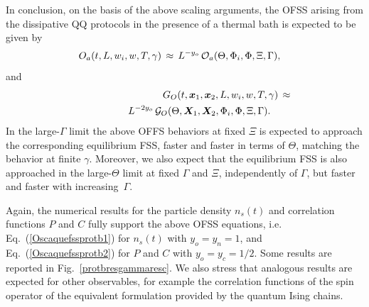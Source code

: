 In conclusion, on the basis of the above scaling arguments, the OFSS
arising from the dissipative QQ protocols in the presence of a thermal
bath is expected to be given by
\begin{eqnarray}
   O_a(t, L, w_i, w, T, \gamma) \, \approx \, L^{-y_o} \,
  {\cal O}_a(\Theta, \Phi_i, \Phi, \Xi, \Gamma),\quad
  \label{Oscaquefssprotb1}
\end{eqnarray}
and
\begin{eqnarray}
&& G_{O}(t, {\bm x}_1, {\bm x}_2, L, w_i, w, T, \gamma)  \, \approx
    \label{Oscaquefssprotb2} \\
    &&\qquad\qquad
     L^{-2y_o} \, {\cal G}_{O}(\Theta, {\bm X}_1, {\bm X}_2, \Phi_i,
    \Phi, \Xi, \Gamma). \qquad \nonumber
\end{eqnarray}
In the large-$\Gamma$ limit the above OFFS behaviors at fixed $\Xi$ is
expected to approach the corresponding equilibrium FSS, faster and
faster in terms of $\Theta$, matching the behavior at finite $\gamma$.
Moreover, we also expect that the equilibrium FSS is also approached
in the large-$\Theta$ limit at fixed $\Gamma$ and $\Xi$, independently
of $\Gamma$, but faster and faster with increasing~$\Gamma$.

Again, the numerical results for the particle density $n_s(t)$ and
correlation functions $P$ and $C$ fully support the above OFSS
equations, i.e. Eq.~(\ref{Oscaquefssprotb1}) for $n_s(t)$ with
$y_o=y_n=1$, and Eq.~(\ref{Oscaquefssprotb2}) for $P$ and $C$ with
$y_o=y_c=1/2$. Some results are reported in
Fig.~\ref{protbresgammaresc}.  We also stress that analogous results
are expected for other observables, for example the correlation
functions of the spin operator of the equivalent formulation provided
by the quantum Ising chains.


